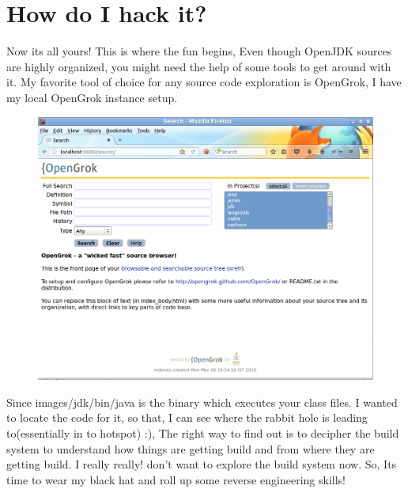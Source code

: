 \documentclass{article}
\begin{document}
\section{How do I hack it?}
Now its all yours! This is where the fun begins, Even though OpenJDK sources are highly organized, you might need the help of some tools to get around with it. My favorite tool of choice for any source code exploration is OpenGrok, I have my local OpenGrok instance setup.
\begin{figure}[H]
\centering
\includegraphics[width=\textwidth]{OpenJDK-4.png}
\caption{}
\end{figure}
Since images/jdk/bin/java is the binary which executes your class files. I wanted to locate the code for it, so that, I can see where the rabbit hole is leading to(essentially in to hotspot) :), The right way to find out is to decipher the build system to understand how things are getting build and from where they are getting build. I really really! don’t want to explore the build system now. So, Its time to wear my black hat and roll up some reverse engineering skills!
\end{document}
